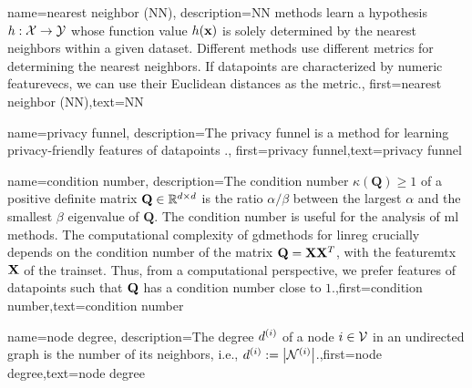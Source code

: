 {
	name={nearest neighbor (NN)},
	description={NN methods learn a \gls{hypothesis} 
		$h: \mathcal{X} \rightarrow \mathcal{Y}$ whose function value $h({\bf x})$ 
		is solely determined by the nearest \gls{neighbors} within a given \gls{dataset}. Different 
		methods use different metrics for determining the nearest \gls{neighbors}. If \gls{datapoint}s 
		are characterized by numeric \gls{featurevec}s, we can use their Euclidean distances as 
		the metric.},
	first={nearest neighbor (NN)},text={NN} 
}

{name={privacy funnel},
 description={The privacy funnel is a method for learning privacy-friendly \gls{feature}s 
	of \gls{datapoint}s \cite{PrivacyFunnel}.},
 first={privacy funnel},text={privacy funnel} 
}

{
	name={condition number},
	description={The condition number $\kappa(\mathbf{Q}) \geq 1$ of a 
		positive definite 
		matrix $\mathbf{Q} \in \mathbb{R}^{d \times d}$ is the ratio 
		$\alpha /\beta  $ between the 
		largest $\alpha$ and the smallest $\beta$ \gls{eigenvalue} of 
		$\mathbf{Q}$. The condition number is useful for the analysis of \gls{ml} methods. 
		The computational complexity of \gls{gdmethods} for \gls{linreg} crucially depends on the 
		condition number of the matrix $\mathbf{Q} = {\bf X} {\bf X}^{T}$, with the \gls{featuremtx} ${\bf X}$ 
		of the \gls{trainset}. Thus, from a computational perspective, we prefer \gls{feature}s of 
		\gls{datapoint}s such that $\mathbf{Q}$ has a condition number close to $1$.},first={condition number},text={condition number} 
}

{name={node degree},
	description={The degree $d^{(i)}$ of a node $i \in \mathcal{V}$ 
		in an undirected \gls{graph} is the number of its \gls{neighbors}, i.e., $d^{(i)} := \big|\mathcal{N}^{(i)}\big|$.},first={node degree},text={node degree} 
}

